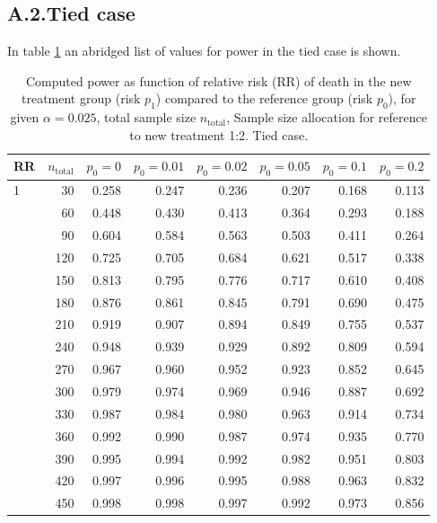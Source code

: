 \documentclass[bimj,fleqn]{w-art}\usepackage[]{graphicx}\usepackage[]{color}
\theoremstyle{plain}
\theoremstyle{definition}
\begin{document}
\subsection*{A.2.\enspace Tied case}
In table \ref{tab:AppendixTied} an abridged list of values for power in the tied
case is shown.

\begin{table}[ht]
\centering
\caption{Computed power as function of relative risk
             (RR) of death in the new treatment group (risk $p_1$) compared to
             the reference group (risk $p_0$), for given $\alpha =0.025$,
             total sample size $n_{\text{total}}$, Sample size allocation for
             reference to new treatment 1:2. Tied case.} 
\label{tab:AppendixTied}
\begin{tabular}{lrrrrrrr}
  \hline
RR & $n_{\text{total}}$ & $p_0 = 0$ & $p_0 = 0.01$ & $p_0 = 0.02$ & $p_0 = 0.05$ & $p_0 = 0.1$ & $p_0 = 0.2$ \\ 
  \hline
1 & 30 & 0.258 & 0.247 & 0.236 & 0.207 & 0.168 & 0.113 \\ 
   & 60 & 0.448 & 0.430 & 0.413 & 0.364 & 0.293 & 0.188 \\ 
   & 90 & 0.604 & 0.584 & 0.563 & 0.503 & 0.411 & 0.264 \\ 
   & 120 & 0.725 & 0.705 & 0.684 & 0.621 & 0.517 & 0.338 \\ 
   & 150 & 0.813 & 0.795 & 0.776 & 0.717 & 0.610 & 0.408 \\ 
   & 180 & 0.876 & 0.861 & 0.845 & 0.791 & 0.690 & 0.475 \\ 
   & 210 & 0.919 & 0.907 & 0.894 & 0.849 & 0.755 & 0.537 \\ 
   & 240 & 0.948 & 0.939 & 0.929 & 0.892 & 0.809 & 0.594 \\ 
   & 270 & 0.967 & 0.960 & 0.952 & 0.923 & 0.852 & 0.645 \\ 
   & 300 & 0.979 & 0.974 & 0.969 & 0.946 & 0.887 & 0.692 \\ 
   & 330 & 0.987 & 0.984 & 0.980 & 0.963 & 0.914 & 0.734 \\ 
   & 360 & 0.992 & 0.990 & 0.987 & 0.974 & 0.935 & 0.770 \\ 
   & 390 & 0.995 & 0.994 & 0.992 & 0.982 & 0.951 & 0.803 \\ 
   & 420 & 0.997 & 0.996 & 0.995 & 0.988 & 0.963 & 0.832 \\ 
   & 450 & 0.998 & 0.998 & 0.997 & 0.992 & 0.973 & 0.856 \\ 

\end{tabular}
\end{table}
\end{document}
